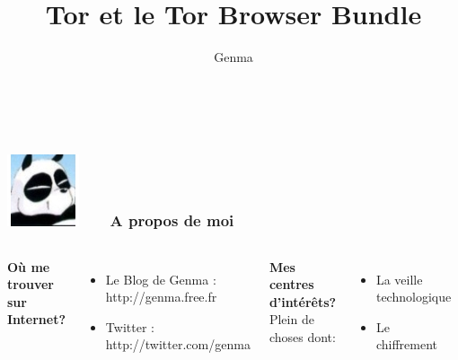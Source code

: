 \documentclass{beamer}
\title[Tor et le Tor Browser Bundle]{Tor et le Tor Browser Bundle}
\author{Genma}
\begin{document}
\begin{frame}
	\titlepage
	\vfill
	\begin{center}
		\\[2.5ex]
		{\tiny\CcNote{\CcLongnameByNcSa}}
		\vspace*{-2.5ex}
	\end{center}
\end{frame}





\begin{frame}
\frametitle{\includegraphics[scale=0.4]{./Genma.jpg} \ \ \  A propos de moi  }
\begin{columns}[c] 

\textbf{Où me trouver sur Internet?}
\begin{itemize}
\item Le Blog de Genma : http://genma.free.fr
\item Twitter : http://twitter.com/genma
\end{itemize}

\textbf{Mes centres d'intérêts?}
\\ Plein de choses dont:
\begin{itemize}
\item La veille technologique
\item Le chiffrement
\end{itemize}

\includegraphics[width=5cm,height=5cm]{blog.png} 

\end{columns}
\end{frame}
\end{document}
